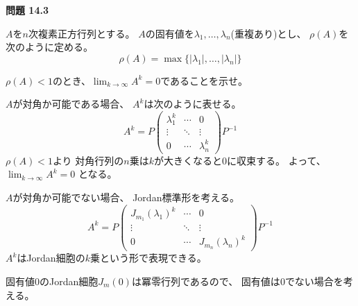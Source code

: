 \documentclass[12pt,b5paper]{ltjsarticle}
\begin{document}
\hrulefill

\textbf{問題 14.3}

$A$を$n$次複素正方行列とする。
$A$の固有値を$\lambda_1,\dots,\lambda_n$(重複あり)とし、
$\rho(A)$を次のように定める。
\begin{equation}
 \rho(A) = \max \{\lvert \lambda_1 \rvert ,\dots, \lvert \lambda_n \rvert \}
\end{equation}

$\rho(A)<1$のとき、$\lim_{k\rightarrow \infty} A^k =0$であることを示せ。

\dotfill


$A$が対角か可能である場合、
$A^k$は次のように表せる。
\begin{equation}
 A^k=P
  \begin{pmatrix}
   \lambda_1^k & \cdots & 0\\
   \vdots & \ddots & \vdots\\
   0 & \cdots & \lambda_n^k
  \end{pmatrix}
  P^{-1}
\end{equation}
$\rho(A)<1$より
対角行列の$n$乗は$k$が大きくなると$0$に収束する。
よって、
$\lim_{k\rightarrow \infty} A^k =0$
となる。

$A$が対角か可能でない場合、
Jordan標準形を考える。
\begin{equation}
 A^k=P
  \begin{pmatrix}
   J_{m_1}(\lambda_1)^k & \cdots & 0\\
   \vdots & \ddots & \vdots\\
   0 & \cdots & J_{m_n}(\lambda_n)^k
  \end{pmatrix}
  P^{-1}
  \label{jordanform}
\end{equation}
$A^k$はJordan細胞の$k$乗という形で表現できる。

固有値$0$のJordan細胞$J_m(0)$は冪零行列であるので、
固有値は$0$でない場合を考える。
\end{document}
